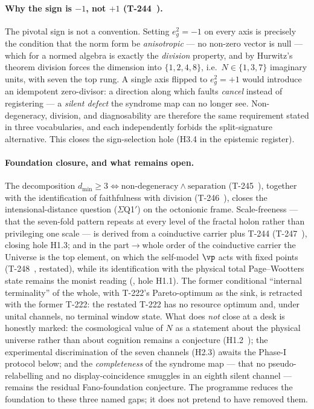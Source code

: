 \paragraph{Why the sign is $-1$, not $+1$ (T-244~).}
The pivotal sign is not a convention. Setting $e_g^2 = -1$ on every axis is
precisely the condition that the norm form be \emph{anisotropic} --- no non-zero
vector is null --- which for a normed algebra is exactly the \emph{division}
property, and by Hurwitz's theorem division forces the dimension into
$\{1,2,4,8\}$, i.e.\ $N \in \{1,3,7\}$ imaginary units, with seven the top rung. A
single axis flipped to $e_g^2 = +1$ would introduce an idempotent zero-divisor: a
direction along which faults \emph{cancel} instead of registering --- a
\emph{silent defect} the syndrome map can no longer see. Non-degeneracy, division,
and diagnosability are therefore the same requirement stated in three vocabularies,
and each independently forbids the split-signature alternative. This closes the
sign-selection hole (H3.4 in the epistemic register).

\paragraph{Foundation closure, and what remains open.}
The decomposition $d_{\min} \geq 3 \Leftrightarrow \text{non-degeneracy} \wedge
\text{separation}$ (T-245~), together with the identification of
faithfulness with division (T-246~), closes the intensional-distance
question ($\Sigma$Q1$'$) on the octonionic frame. Scale-freeness --- that the
seven-fold pattern repeats at every level of the fractal holon rather than
privileging one scale --- is derived from a coinductive carrier plus T-244
(T-247~), closing hole H1.3; and in the part$\to$whole order of the
coinductive carrier the Universe is the top element, on which the self-model
$\vp$ acts with fixed points (T-248~, restated), while its
identification with the physical total Page--Wootters state remains the monist
reading (, hole H1.1). The former conditional ``internal terminality''
of the whole, with T-222's Pareto-optimum as the sink, is retracted with the
former T-222: the restated T-222 has no resource optimum and, under unital
channels, no terminal window state. What does \emph{not}
close at a desk is honestly marked: the cosmological value of $N$ as a statement
about the physical universe rather than about cognition remains a conjecture
(H1.2~); the experimental discrimination of the seven channels
(H2.3) awaits the Phase-I protocol below; and the \emph{completeness} of the
syndrome map --- that no pseudo-relabelling and no display-coincidence smuggles in
an eighth silent channel --- remains the residual Fano-foundation conjecture. The
programme reduces the foundation to these three named gaps; it does not pretend to
have removed them.

